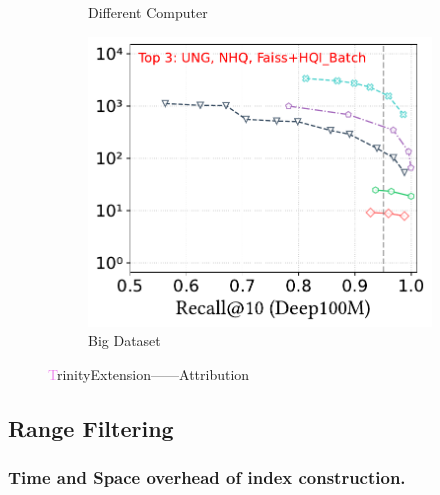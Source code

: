 \documentclass[sigconf, nonacm]{acmart}
\begin{document}
\begin{figure}[t]
\begin{subfigure}[t]{0.315\columnwidth}
			\caption{\footnotesize Different Computer}
			\label{fig:rangeFilter_index_size_mb}
		\end{subfigure}
		\hfill
		\begin{subfigure}[t]{0.315\columnwidth}
			\centering
			\includegraphics[width=\linewidth]{figures/exp/attribute_100M.pdf}
			\caption{\footnotesize Big Dataset}
			\label{fig:rangeFilter_build_memory_mb}
		\end{subfigure}

		
		\caption{\textcolor{violet}TrinityExtension——Attribution}
		\label{fig:TrinityExtension——Attribution}
	\end{figure}
	
	\subsection{Range Filtering}
	
	\subsubsection{Time and Space overhead of index construction.}
	
\end{document}
